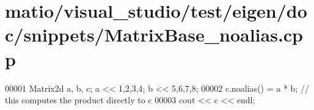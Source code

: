 \hypertarget{matio_2visual__studio_2test_2eigen_2doc_2snippets_2_matrix_base__noalias_8cpp_source}{}\section{matio/visual\+\_\+studio/test/eigen/doc/snippets/\+Matrix\+Base\+\_\+noalias.cpp}
\label{matio_2visual__studio_2test_2eigen_2doc_2snippets_2_matrix_base__noalias_8cpp_source}

\begin{DoxyCode}
00001 Matrix2d a, b, c; a << 1,2,3,4; b << 5,6,7,8;
00002 c.noalias() = a * b; \textcolor{comment}{// this computes the product directly to c}
00003 cout << c << endl;
\end{DoxyCode}

